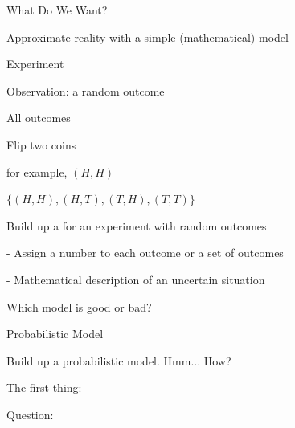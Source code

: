 \documentclass[handout,fleqn,aspectratio=169]{beamer}
\begin{document}
\begin{frame}{What Do We Want?}


\hspace{-0.2in} Approximate reality with a simple (mathematical) model


{
\bci
\item<1-> Experiment

\item<2-> Observation: a random outcome

\item<3-> All outcomes
\eci 
}
{
\bci [$\circ$] 
\item<1-> Flip two coins

\item<2-> for example, $(H,H)$

\item<3-> $\{ (H,H), (H,T), (T,H), (T,T) \}$

\eci 
}
\separator

\bci

\item<4->  Build up a  for an experiment with random outcomes


\item<6->  

- Assign a number to each outcome or a set of outcomes

- Mathematical description of an uncertain situation

\item<7-> Which model is good or bad?

\eci
\end{frame}

\begin{frame}{Probabilistic Model}

 Build up a probabilistic model. Hmm... How?

The first thing: 

\bigskip

\bigskip

\alert{Question:} 

\end{frame}
\end{document}
